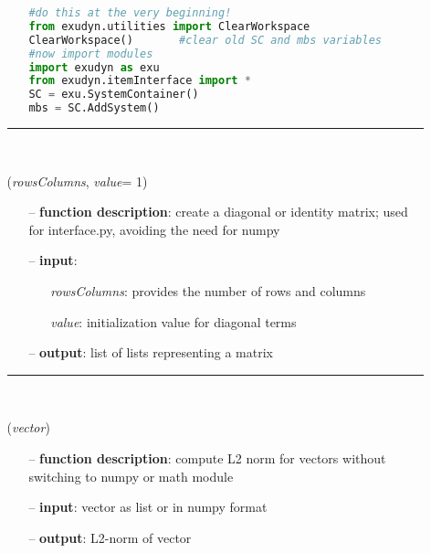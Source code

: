 \begin{itemize}[leftmargin=1.4cm]
\begin{itemize}[leftmargin=0.5cm]
\begin{itemize}[leftmargin=0.7cm]
\begin{lstlisting}[language=Python, xleftmargin=36pt]
#do this at the very beginning!
from exudyn.utilities import ClearWorkspace
ClearWorkspace()       #clear old SC and mbs variables
#now import modules
import exudyn as exu
from exudyn.itemInterface import *
SC = exu.SystemContainer()
mbs = SC.AddSystem()\end{lstlisting}\vspace{-24pt}\bi\item[]\vspace{-24pt}\vspace{12pt}\end{itemize}
%
\noindent\rule{8cm}{0.75pt}\vspace{1pt} \\ 
\begin{flushleft}
\label{sec:basicUtilities:DiagonalMatrix}
({\it rowsColumns}, {\it value}= 1)
\end{flushleft}
\setlength{\itemindent}{0.7cm}
\begin{itemize}[leftmargin=0.7cm]
  \item[--]  {\bf function description}: create a diagonal or identity matrix; used for interface.py, avoiding the need for numpy  \item[--]  {\bf input}: \vspace{-6pt}
  \begin{itemize}[leftmargin=1.2cm]
\setlength{\itemindent}{-0.7cm}
    \item[] {\it rowsColumns}: provides the number of rows and columns
    \item[] {\it        value}: initialization value for diagonal terms
  \end{itemize}
  \item[--]  {\bf output}: list of lists representing a matrix\vspace{12pt}\end{itemize}
%
\noindent\rule{8cm}{0.75pt}\vspace{1pt} \\ 
\begin{flushleft}
\label{sec:basicUtilities:NormL2}
({\it vector})
\end{flushleft}
\setlength{\itemindent}{0.7cm}
\begin{itemize}[leftmargin=0.7cm]
  \item[--]  {\bf function description}: compute L2 norm for vectors without switching to numpy or math module  \item[--]  {\bf input}: vector as list or in numpy format  \item[--]  {\bf output}: L2-norm of vector\vspace{12pt}\end{itemize}

\end{itemize}
\end{itemize}

